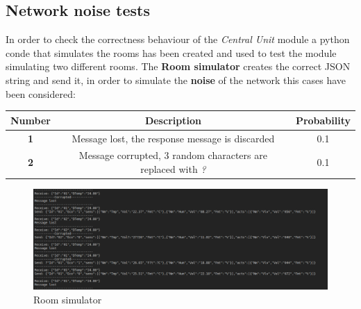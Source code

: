\subsection{Network noise tests}
In order to check the correctness behaviour of the \textit{Central Unit} module a python conde that simulates the rooms has been created and used to test the module simulating two different rooms.
The \textbf{Room simulator} creates the correct JSON string and send it, in order to simulate the \textbf{noise} of the network this cases have been considered:
\begin{center}
	\begin{tabular}{||c | c | c ||} 
		\hline
		Number			& 	Description & Probability\\ 
		\hline
		\textbf{1}		&	Message lost, the response message is discarded & 0.1 \\ 
		\hline
		\textbf{2}		&	Message corrupted, 3 random characters are replaced with \textit{?} & 0.1\\ 
		\hline
	\end{tabular}
\end{center}
\begin{figure}[H]
	\centering
	\includegraphics[width=12cm,keepaspectratio]{img/room_simulator}
	\caption{Room simulator}
	\label{fig:roomsimulator}
\end{figure}